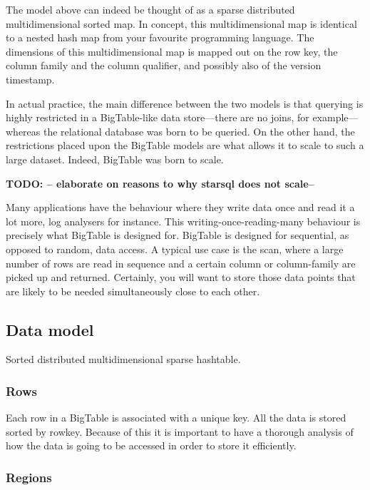 \documentclass[a4paper,10pt]{book}
\begin{document}
The model above can indeed be thought of as a sparse distributed
multidimensional sorted map. In concept, this multidimensional map is
identical to a nested hash map from your favourite programming language. The
dimensions of this multidimensional map is mapped out on the row key, the
column family and the column qualifier, and possibly also of the version
timestamp.

In actual practice, the main difference between the two models is that
querying is highly restricted in a BigTable-like data store---there are no
joins, for example---whereas the relational database was born to be queried.
On the other hand, the restrictions placed upon the BigTable models are
what allows it to scale to such a large dataset. Indeed, BigTable was born
to scale.

\textbf{TODO: -- elaborate on reasons to why starsql does not scale--}

Many applications have the behaviour where they write data once and read it
a lot more, log analysers for instance. This writing-once-reading-many
behaviour is precisely what BigTable is designed for. BigTable is designed
for sequential, as opposed to random, data access. A typical use case is
the scan, where a large number of rows are read in sequence and a certain
column or column-family are picked up and returned. Certainly, you will
want to store those data points that are likely to be needed simultaneously
close to each other. \cite{bigtable}


\subsection{Data model}

Sorted distributed multidimensional sparse hashtable.


\subsubsection{Rows}

Each row in a BigTable is associated with a unique key. All the data is
stored sorted by rowkey. Because of this it is important to have a thorough
analysis of how the data is going to be accessed in order to store it
efficiently.



\subsubsection{Regions}
\end{document}
